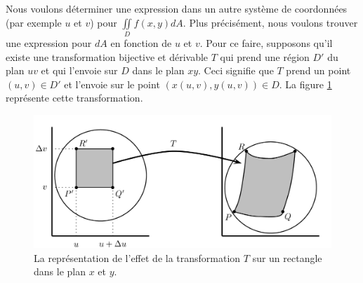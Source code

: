 \documentclass[]{book}
\theoremstyle{definition}
\theoremstyle{definition}
\theoremstyle{definition}
\theoremstyle{remark}
\begin{document}
Nous voulons déterminer une expression dans un autre système de
coordonnées (par exemple \(u\) et \(v\)) pour
\(\iint\limits_D f(x,y)dA\). Plus précisément, nous voulons trouver une
expression pour \(dA\) en fonction de \(u\) et \(v\). Pour ce faire,
supposons qu'il existe une transformation bijective et dérivable \(T\)
qui prend une région \(D'\) du plan \(uv\) et qui l'envoie sur \(D\)
dans le plan \(xy\). Ceci signifie que \(T\) prend un point
\((u,v)\in D'\) et l'envoie sur le point \((x(u,v),y(u,v))\in D\). La
figure \ref{fig:jacobien2d} représente cette transformation.

\begin{figure}

{\centering \includegraphics[width=0.75\linewidth]{resources/images/latex/jacobien2d} 

}

\caption{La représentation de l'effet de la transformation $T$ sur un rectangle dans le plan $x$ et $y$.}\label{fig:jacobien2d}
\end{figure}
\end{document}
